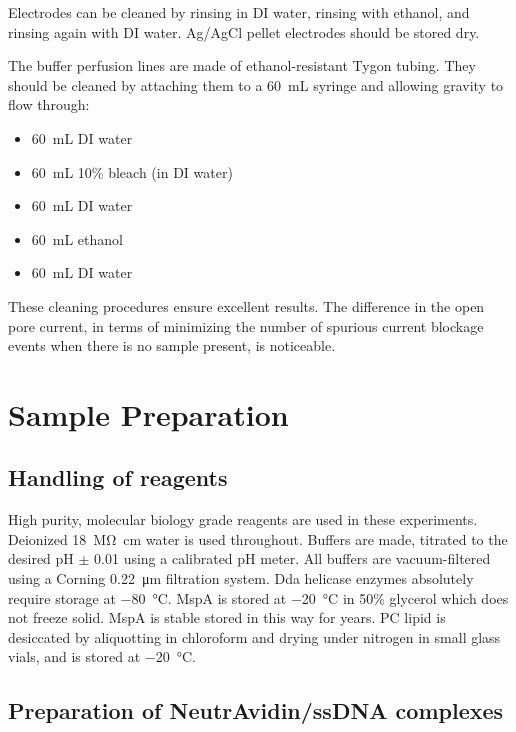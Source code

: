 Electrodes can be cleaned by rinsing in DI water, rinsing with ethanol, and rinsing again with DI water.  Ag/AgCl pellet electrodes should be stored dry.

The buffer perfusion lines are made of ethanol-resistant Tygon tubing.  They should be cleaned by attaching them to a \SI{60}{\mL} syringe and allowing gravity to flow through:

\begin{itemize}
\item \SI{60}{\mL} DI water
\item \SI{60}{\mL} \num{10}\% bleach (in DI water)
\item \SI{60}{\mL} DI water
\item \SI{60}{\mL} ethanol
\item \SI{60}{\mL} DI water
\end{itemize}

These cleaning procedures ensure excellent results.  The difference in the open pore current, in terms of minimizing the number of spurious current blockage events when there is no sample present, is noticeable.

\section{Sample Preparation}
\label{sample_prep}

\subsection{Handling of reagents}

High purity, molecular biology grade reagents are used in these experiments.  Deionized \SI{18}{\mega\ohm\cm} water is used throughout.  Buffers are made, titrated to the desired pH $\pm$ \num{0.01} using a calibrated pH meter.  All buffers are vacuum-filtered using a Corning \SI{0.22}{\micro\m} filtration system.  Dda helicase enzymes absolutely require storage at \SI{-80}{\celsius}.  MspA is stored at \SI{-20}{\celsius} in \num{50}\% glycerol which does not freeze solid.  MspA is stable stored in this way for years.  PC lipid is desiccated by aliquotting in chloroform and drying under nitrogen in small glass vials, and is stored at \SI{-20}{\celsius}.

\subsection{Preparation of NeutrAvidin/ssDNA complexes}

